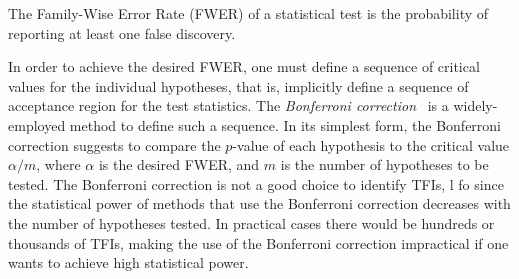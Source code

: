 \begin{definition}\label{def:FWER}
  The Family-Wise Error Rate (FWER) of a statistical test is the probability of reporting
  at least one false discovery.
\end{definition}

In order to achieve the desired FWER, one must define a sequence of critical
values for the individual hypotheses, that is, implicitly define a sequence of
acceptance region for the test statistics. The \emph{Bonferroni
correction}~\citep{DudoitSB03} is a widely-employed method to define such a
sequence. In its simplest form, the Bonferroni correction suggests to compare
the $p$-value of each hypothesis to the critical value $\alpha/m$, where $\alpha$ is the
desired FWER, and $m$ is the number of hypotheses to be tested.  The Bonferroni
correction is not a good choice to identify TFIs,
l%
fo%
since the statistical power of methods that use the Bonferroni
correction decreases with the number of hypotheses tested. In practical cases
there would be hundreds or thousands of TFIs, making the use of the Bonferroni
correction impractical if one wants to achieve high statistical power.
\fi





